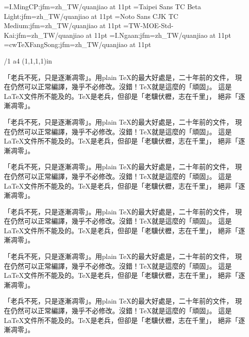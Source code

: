 
\jfont\ming={I.MingCP:jfm=zh_TW/quanjiao} at 11pt
\jfont\hei={Taipei Sans TC Beta Light:jfm=zh_TW/quanjiao} at 11pt
\jfont\heib={Noto Sans CJK TC Medium:jfm=zh_TW/quanjiao} at 11pt
\jfont\kai={TW-MOE-Std-Kai:jfm=zh_TW/quanjiao} at 11pt
\jfont\iyan={I.Ngaan:jfm=zh_TW/quanjiao} at 11pt
\jfont\fangsong={cwTeXFangSong:jfm=zh_TW/quanjiao} at 11pt


\margins/1 a4 (1,1,1,1)in  %
\typosize[11/16.4]

\ming
「老兵不死，只是逐漸凋零」。用plain \TeX{}的最大好處是，二十年前的文件，
現在仍然可以正常編譯，幾乎不必修改。沒錯！\TeX{}就是這麼的「頑固」。
這是\LaTeX{}文件所不能及的。\TeX{}是老兵，但卻是「老驥伏櫪，志在千里」，
絕非「逐漸凋零」。

\hei
「老兵不死，只是逐漸凋零」。用plain \TeX{}的最大好處是，二十年前的文件，
現在仍然可以正常編譯，幾乎不必修改。沒錯！\TeX{}就是這麼的「頑固」。
這是\LaTeX{}文件所不能及的。\TeX{}是老兵，但卻是「老驥伏櫪，志在千里」，
絕非「逐漸凋零」。

\heib
「老兵不死，只是逐漸凋零」。用plain \TeX{}的最大好處是，二十年前的文件，
現在仍然可以正常編譯，幾乎不必修改。沒錯！\TeX{}就是這麼的「頑固」。
這是\LaTeX{}文件所不能及的。\TeX{}是老兵，但卻是「老驥伏櫪，志在千里」，
絕非「逐漸凋零」。

\kai
「老兵不死，只是逐漸凋零」。用plain \TeX{}的最大好處是，二十年前的文件，
現在仍然可以正常編譯，幾乎不必修改。沒錯！\TeX{}就是這麼的「頑固」。
這是\LaTeX{}文件所不能及的。\TeX{}是老兵，但卻是「老驥伏櫪，志在千里」，
絕非「逐漸凋零」。

\iyan
「老兵不死，只是逐漸凋零」。用plain \TeX{}的最大好處是，二十年前的文件，
現在仍然可以正常編譯，幾乎不必修改。沒錯！\TeX{}就是這麼的「頑固」。
這是\LaTeX{}文件所不能及的。\TeX{}是老兵，但卻是「老驥伏櫪，志在千里」，
絕非「逐漸凋零」。

\fangsong
「老兵不死，只是逐漸凋零」。用plain \TeX{}的最大好處是，二十年前的文件，
現在仍然可以正常編譯，幾乎不必修改。沒錯！\TeX{}就是這麼的「頑固」。
這是\LaTeX{}文件所不能及的。\TeX{}是老兵，但卻是「老驥伏櫪，志在千里」，
絕非「逐漸凋零」。

\bye
